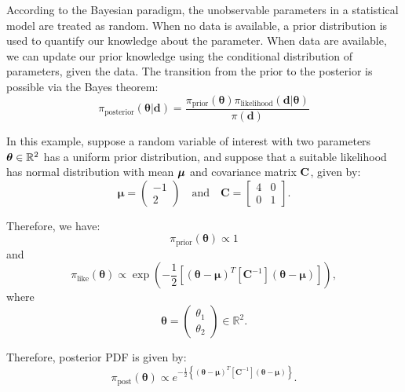 According to the Bayesian paradigm, the unobservable parameters
in a statistical model are treated as random. When no data is available,
a prior distribution is used to quantify our knowledge about the parameter.
When data are available, we can update our prior knowledge using the conditional distribution of parameters, given the data. 
The transition from the prior to the posterior is possible via the Bayes theorem:
\begin{equation*}
\pi_{\text{posterior}}(\boldsymbol{\theta}|\mathbf{d})=\frac{\pi_{\text{prior}}(\boldsymbol{\theta})\pi_{\text{likelihood}}(\mathbf{d}|\boldsymbol{\theta})}{\pi(\mathbf{d})}
\end{equation*}


In this example, suppose a random variable of interest with two parameters $\mbox{\boldmath$ \theta $} \in \mathbb{R}^2$ has a uniform prior distribution, and suppose that a suitable likelihood has normal distribution with mean $\mbox{\boldmath$ \mu $}$ and covariance matrix $\bf{C}$, given by:
\begin{equation}\label{eq-example-mu}
\boldsymbol{\mu} = 
\left(\begin{array}{c}
-1 \\
2
\end{array}\right)
\quad
\text{and}
\quad
\mathbf{C} = 
\left[\begin{array}{cc}
4 & 0 \\
0 & 1
\end{array}\right].
\end{equation}

Therefore, we have: 
\begin{equation*}
\pi_{\text{prior}}(\boldsymbol{\theta}) \varpropto 1
\end{equation*}
and
\begin{equation*}
\pi_{\text{like}}(\boldsymbol{\theta}) \varpropto \exp \left(-\frac{1}{2}\left[(\boldsymbol{\theta}-\boldsymbol{\mu})^T[\mathbf{C}^{-1}](\boldsymbol{\theta}-\boldsymbol{\mu})\right] \right),
\end{equation*}
where
\begin{equation*}
\boldsymbol{\theta} = 
\left(
\begin{array}{c}
\theta_1 \\
\theta_2
\end{array}
\right)\in \mathbb{R}^2.
\end{equation*}
%

Therefore,  posterior PDF is given by:
\begin{equation}\label{eq-example-post}
\pi_{\text{post}}(\boldsymbol{\theta}) \varpropto e^{-\frac{1}{2}\left\{(\boldsymbol{\theta}-\boldsymbol{\mu})^T[\mathbf{C}^{-1}](\boldsymbol{\theta}-\boldsymbol{\mu})\right\}}.
\end{equation}


